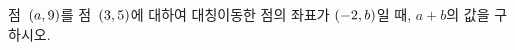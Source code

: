 점~$(a{,}\mkern3mu\mathopen{}9)$를 점~$(3{,}\mkern3mu\mathopen{}5)$에 대하여 대칭이동한 점의 좌표가 $(-2{,}\mkern3mu\mathopen{}b)$일 때, $a+b$의 값을 구하시오.
